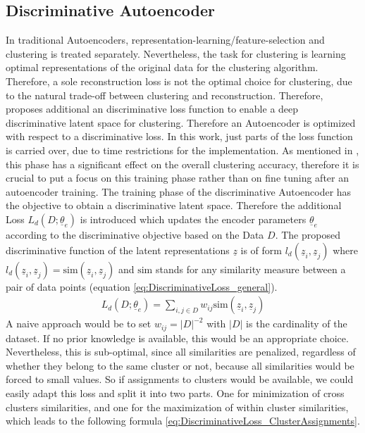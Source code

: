 \documentclass[12pt,DIV14,BCOR12mm,a4paper,footexclude,headinclude,halfparskip-,twoside,openright,openany,cleardoubleempty,idxtotoc,bibtotoc]{scrreprt} %
\numberwithin{equation}{chapter}
\begin{document}
\subsection{Discriminative Autoencoder}
In traditional Autoencoders, representation-learning/feature-selection and clustering is treated separately. Nevertheless, the task for clustering is learning optimal representations of the original data for the clustering algorithm. Therefore, a sole reconstruction loss is not the optimal choice for clustering, due to the natural trade-off between clustering and reconstruction. Therefore, \cite{DiscriminativeClustering} proposes additional an discriminative loss function to enable a deep discriminative latent space for clustering. Therefore an Autoencoder is optimized with respect to a discriminative loss. In this work, just parts of the loss function is carried over, due to time restrictions for the implementation. As mentioned in \cite{DiscriminativeClustering}, this phase has a significant effect on the overall clustering accuracy, therefore it is crucial to put a focus on this training phase rather than on fine tuning after an autoencoder training. The training phase of the discriminative Autoencoder has the objective to obtain a discriminative latent space. Therefore the additional Loss $L_d(D;\underline{\theta}_e)$ is introduced which updates the encoder parameters $\underline{\theta}_e$ according to the discriminative objective based on the Data $D$. The proposed discriminative function of the latent representations $\underline{z}$ is of form $l_d(\underline{z}_i, \underline{z}_j)$ where $l_d(\underline{z}_i, \underline{z}_j) = \textrm{sim}(\underline{z}_i,\underline{z}_j)$ and $\textrm{sim}$ stands for any similarity measure between a pair of data points (equation \ref{eq:DiscriminativeLoss_general}).
\begin{align}
	 L_d(D;\underline{\theta}_e) = \sum_{i,j \in D}w_{ij}\textrm{sim}(\underline{z}_i,\underline{z}_j)\label{eq:DiscriminativeLoss_general}
\end{align}
A naive approach would be to set $w_{ij} = |D|^{-2}$ with $|D|$ is the cardinality of the dataset. If no prior knowledge is available, this would be an appropriate choice. Nevertheless, this is sub-optimal, since all similarities are penalized, regardless of whether they belong to the same cluster or not, because all similarities would be forced to small values. So if assignments to clusters would be available, we could easily adapt this loss and split it into two parts. One for minimization of cross clusters similarities, and one for the maximization of within cluster similarities, which leads to the following formula \ref{eq:DiscriminativeLoss_ClusterAssignments}.
\end{document}
